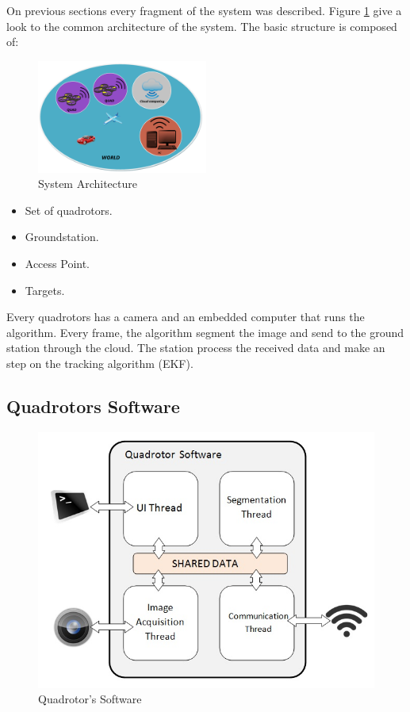 On previous sections every fragment of the system was described. Figure \ref{fig:System_Architecture} give a look to the common architecture of the system. The basic structure is composed of:

\begin{figure}[hp]
	\centering
	\includegraphics[width=0.50\textwidth,natwidth=220,natheight=1467]{../Images/c2/Architecture.png}
	\caption{System Architecture}
	\label{fig:System_Architecture}
\end{figure}


\begin{itemize}
  \item Set of quadrotors.
  \item Groundstation.
  \item Access Point.
  \item Targets.
\end{itemize}

Every quadrotors has a camera and an embedded computer that runs the algorithm. Every frame, the algorithm segment the image and send to the ground station through the cloud. The station process the received data and make an step on the tracking algorithm (EKF).

\newpage
\subsection{Quadrotors Software}

	\begin{figure}[hp]
		\begin{center}
			\includegraphics[width=0.7\linewidth]{../Images/c2/Quadsoftware}
		\end{center}
		\caption{Quadrotor's Software}
		\label{fig:Quadsoftware}
	\end{figure}

